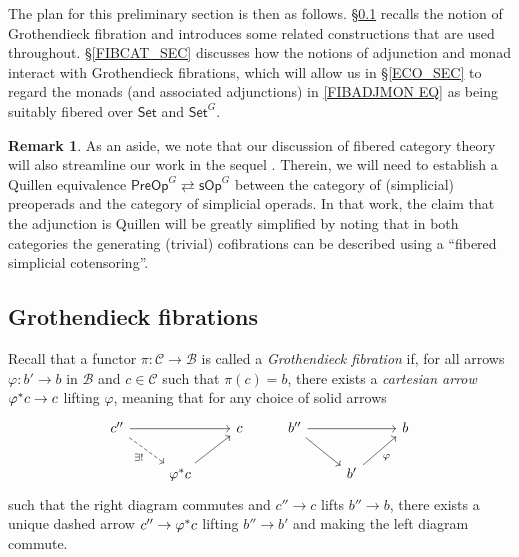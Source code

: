 \documentclass[a4paper,10pt
,draft
]{article}%
\numberwithin{equation}{section}
\numberwithin{figure}{section}
\theoremstyle{definition} %
\newtheorem{remark}[equation]{Remark}%
\newcommand{\1}{\ensuremath{\mathbbm 1}}%
\begin{document}
The plan for this preliminary section is then as follows.
%
\S \ref{GROTFIB SEC} recalls the notion of Grothendieck fibration and
introduces some related constructions that are used throughout.
%
\S \ref{FIBCAT_SEC} discusses how the notions of adjunction and monad interact with Grothendieck fibrations,
which will allow us in \S \ref{ECO_SEC}
to regard the monads
(and associated adjunctions)
in \eqref{FIBADJMON EQ}
as being suitably fibered over $\mathsf{Set}$ and $\mathsf{Set}^G$.
%


\begin{remark}
        As an aside,
        we note that our discussion of fibered category theory will
        also streamline our work in the sequel \cite{BP_TAS}.
        Therein, we will need to establish a Quillen equivalence
        $\mathsf{PreOp}^G \rightleftarrows \mathsf{sOp}^G$
        between the category of (simplicial) preoperads and
        the category of simplicial operads.
        In that work, the claim that the adjunction is Quillen 
        will be greatly simplified by noting that in both categories 
        the generating (trivial) cofibrations
        can be described using a ``fibered simplicial cotensoring''.
\end{remark}



\subsection{Grothendieck fibrations}\label{GROTFIB SEC}


Recall that a functor 
$\pi \colon \mathcal{C} \to \mathcal{B}$
is called a \emph{Grothendieck fibration} if,
for all arrows
$\varphi \colon b' \to b$ in $\mathcal{B}$
and $c \in \mathcal{C}$ such that $\pi(c) = b$,
there exists a \emph{cartesian arrow}
$\varphi^{\**}c \to c$
lifting $\varphi$,
meaning that for any choice of solid arrows
\begin{equation}\label{CARTARDEF EQ}
\begin{tikzcd}
c'' \ar{rr} \ar[dashed]{rd}[swap]{\exists!} 
&&
c
&%
b'' \ar{rr} \ar{rd} 
&&
b
\\
& \varphi^{\**} c \ar{ru}
&
&%
& b'\ar{ru}[swap]{\varphi}
&
\end{tikzcd}
\end{equation}
such that the right diagram commutes and 
$c'' \to c$ lifts $b'' \to b$,
there exists a unique dashed arrow
$c'' \to \varphi^{\**} c$ lifting $b'' \to b'$
and making the left diagram commute.
\end{document}

